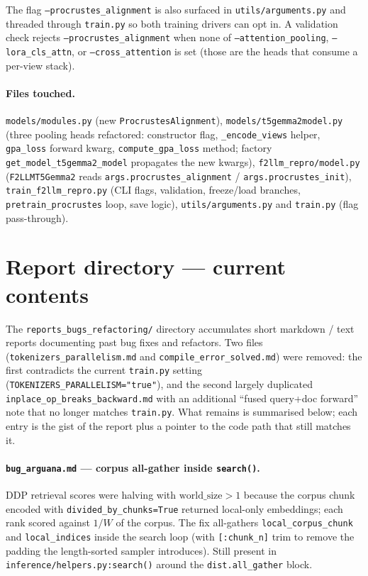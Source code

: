 \documentclass{article}
\begin{document}
\noindent The flag \texttt{--procrustes\_alignment} is also surfaced
in \texttt{utils/arguments.py} and threaded through \texttt{train.py}
so both training drivers can opt in. A validation check rejects
\texttt{--procrustes\_alignment} when none of \texttt{--attention\_pooling},
\texttt{--lora\_cls\_attn}, or \texttt{--cross\_attention} is set
(those are the heads that consume a per-view stack).

\paragraph{Files touched.}
\texttt{models/modules.py} (new \texttt{ProcrustesAlignment}),
\texttt{models/t5gemma2model.py} (three pooling heads refactored:
constructor flag, \texttt{\_encode\_views} helper, \texttt{gpa\_loss}
forward kwarg, \texttt{compute\_gpa\_loss} method; factory
\texttt{get\_model\_t5gemma2\_model} propagates the new kwargs),
\texttt{f2llm\_repro/model.py} (\texttt{F2LLMT5Gemma2} reads
\texttt{args.procrustes\_alignment} / \texttt{args.procrustes\_init}),
\texttt{train\_f2llm\_repro.py} (CLI flags, validation, freeze/load
branches, \texttt{pretrain\_procrustes} loop, save logic),
\texttt{utils/arguments.py} and \texttt{train.py} (flag pass-through).



\section{Report directory --- current contents}
\label{sec:reports-catalog}

The \texttt{reports\_bugs\_refactoring/} directory accumulates short
markdown / text reports documenting past bug fixes and refactors.
Two files (\texttt{tokenizers\_parallelism.md} and
\texttt{compile\_error\_solved.md}) were removed: the first
contradicts the current \texttt{train.py} setting
(\texttt{TOKENIZERS\_PARALLELISM="true"}), and the second largely
duplicated \texttt{inplace\_op\_breaks\_backward.md} with an
additional ``fused query+doc forward'' note that no longer matches
\texttt{train.py}. What remains is summarised below; each entry is
the gist of the report plus a pointer to the code path that still
matches it.

\paragraph{\texttt{bug\_arguana.md} --- corpus all-gather inside
\texttt{search()}.}
DDP retrieval scores were halving with $\text{world\_size}>1$ because
the corpus chunk encoded with \texttt{divided\_by\_chunks=True}
returned local-only embeddings; each rank scored against $1/W$ of the
corpus. The fix all-gathers \texttt{local\_corpus\_chunk} and
\texttt{local\_indices} inside the search loop (with
\texttt{[:chunk\_n]} trim to remove the padding the length-sorted
sampler introduces). Still present in
\texttt{inference/helpers.py:search()} around the
\texttt{dist.all\_gather} block.
\end{document}
